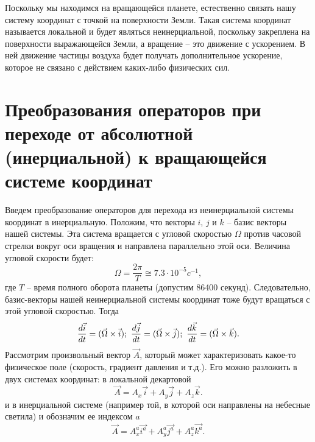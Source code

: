     Поскольку мы находимся на вращающейся планете, естественно связать нашу систему координат с точкой на поверхности Земли. Такая система координат называется локальной и будет являться неинерциальной, поскольку закреплена на поверхности выражающейся Земли, а вращение -- это движение с ускорением. В ней движение частицы воздуха будет получать дополнительное ускорение, которое не связано с действием каких-либо физических сил. 
    
\section{{\color{vms} Преобразования операторов при переходе от абсолютной (инерциальной) к вращающейся системе координат}}
    
    Введем преобразование операторов для перехода из неинерциальной системы координат в инерциальную. Положим, что векторы $i$, $j$ и $k$ -- базис векторы нашей системы. Эта система вращается с угловой скоростью $\Omega$ против часовой стрелки вокруг оси вращения и направлена параллельно этой оси. Величина угловой скорости будет:
    \begin{equation}
        \Omega = \frac{2\pi}{T} \cong 7.3\cdot10^{-5} c^{-1},
    \end{equation}
    где $T$ -- время полного оборота планеты (допустим 86400 секунд). Следовательно, базис-векторы нашей неинерциальной системы координат тоже будут вращаться с этой угловой скоростью. Тогда 
    \begin{equation}
    \label{omega}
        \displaystyle\frac{d \vec{i}}{d t}=(\vec{\Omega}\times\vec{i}); \
        \displaystyle\frac{d \vec{j}}{d t}=(\vec{\Omega}\times\vec{j}); \
        \displaystyle\frac{d \vec{k}}{d t}=(\vec{\Omega}\times\vec{k}).   
    \end{equation}
    Рассмотрим произвольный вектор $\vec{A}$, который может характеризовать какое-то физическое поле (скорость, градиент давления и т.д.). Его можно разложить в двух системах координат: в локальной декартовой
    \begin{equation}
        \vec{A} = A_x\vec{i}+A_y\vec{j}+A_z\vec{k}. 
    \end{equation}
    и в инерциальной системе (например той, в которой оси направлены на небесные светила) и обозначим ее индексом $a$
    \begin{equation}
        \vec{A} = A_x^a\vec{i^a}+A_y^a\vec{j^a}+A_z^a\vec{k^a}.
    \end{equation}

